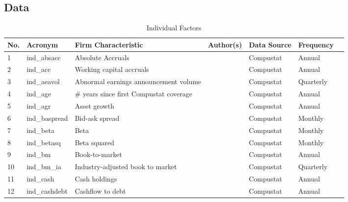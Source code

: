 \documentclass[11pt, a4paper, table]{article}
\begin{document}
\subsection{Data}


\begin{landscape}
	\begin{center}
		\label{ind_factors}
		\begin{longtable}{lllllll}
			\caption{Individual Factors} \\ \hline
			No. & Acronym & Firm Characteristic & Author(s) & Data Source & Frequency \\ \hline
			1 & ind\_absacc\footnotemark[\value{footnote}] & Absolute Accruals & 
				\cite{bandyopadhyay_accrual_2010} & Compustat & Annual \\
			2 & ind\_acc\footnotemark[\value{footnote}] & Working capital accruals & 
				\cite{sloan_stock_1996} & Compustat & Annual \\
			3 & ind\_aeavol & Abnormal earnings announcement volume & 
				\cite{lerman_high-volume_2008} & Compustat & Quarterly \\
			4 & ind\_age & \# years since first Compustat coverage & 
				\cite{jiang_information_2005} & Compustat & Annual \\
			5 & ind\_agr & Asset growth & 
				\cite{cooper_asset_2008} & Compustat & Annual \\
			6 & ind\_baspread & Bid-ask spread & 
				\cite{amihud_effects_1989} & Compustat & Monthly \\
			7 & ind\_beta & Beta & 
				\cite{fama_risk_1973} & Compustat & Monthly \\
			8 & ind\_betasq & Beta squared & 
				\cite{fama_risk_1973} & Compustat & Monthly \\
			9 & ind\_bm & Book-to-market & 
				\cite{rosenberg_persuasive_1985} & Compustat & Annual \\
			10 & ind\_bm\_ia & Industry-adjusted book to market & 
				\cite{asness_predicting_2000} & Compustat & Quarterly \\
			11 & ind\_cash & Cash holdings & 
				\cite{palazzo_cash_2012} & Compustat & Annual \\
			12 & ind\_cashdebt & Cashflow to debt & 
				\cite{ou_financial_1989} & Compustat & Annual \\

\end{longtable}
\end{center}
\end{landscape}
\end{document}
